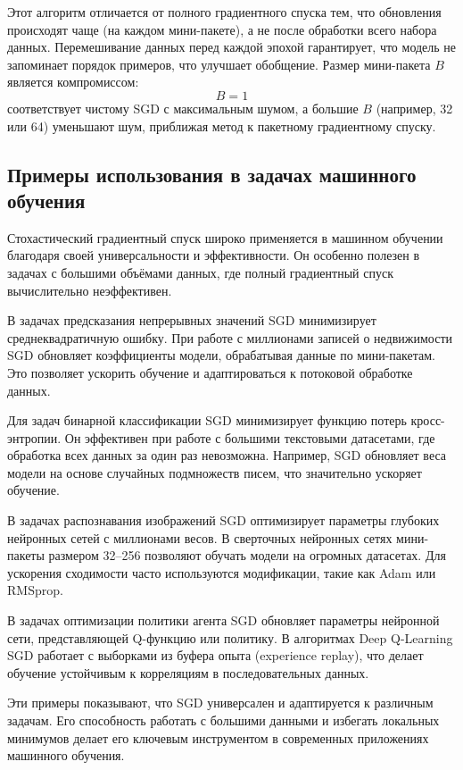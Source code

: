 \documentclass[11pt,a4paper]{article}
\begin{document}
Этот алгоритм отличается от полного градиентного спуска тем, что обновления происходят чаще (на каждом мини-пакете), а не после обработки всего набора данных. Перемешивание данных перед каждой эпохой гарантирует, что модель не запоминает порядок примеров, что улучшает обобщение. Размер мини-пакета \( B \) является компромиссом: 
\begin{equation}
B = 1
\end{equation}
соответствует чистому SGD с максимальным шумом, а большие \( B \) (например, 32 или 64) уменьшают шум, приближая метод к пакетному градиентному спуску.

\subsection{Примеры использования в задачах машинного обучения}
Стохастический градиентный спуск широко применяется в машинном обучении благодаря своей универсальности и эффективности. Он особенно полезен в задачах с большими объёмами данных, где полный градиентный спуск вычислительно неэффективен.

В задачах предсказания непрерывных значений SGD минимизирует среднеквадратичную ошибку. При работе с миллионами записей о недвижимости SGD обновляет коэффициенты модели, обрабатывая данные по мини-пакетам. Это позволяет ускорить обучение и адаптироваться к потоковой обработке данных.

Для задач бинарной классификации SGD минимизирует функцию потерь кросс-энтропии. Он эффективен при работе с большими текстовыми датасетами, где обработка всех данных за один раз невозможна. Например, SGD обновляет веса модели на основе случайных подмножеств писем, что значительно ускоряет обучение.

В задачах распознавания изображений SGD оптимизирует параметры глубоких нейронных сетей с миллионами весов. В сверточных нейронных сетях мини-пакеты размером 32--256 позволяют обучать модели на огромных датасетах. Для ускорения сходимости часто используются модификации, такие как Adam или RMSprop.

В задачах оптимизации политики агента SGD обновляет параметры нейронной сети, представляющей Q-функцию или политику. В алгоритмах Deep Q-Learning SGD работает с выборками из буфера опыта (experience replay), что делает обучение устойчивым к корреляциям в последовательных данных.

Эти примеры показывают, что SGD универсален и адаптируется к различным задачам. Его способность работать с большими данными и избегать локальных минимумов делает его ключевым инструментом в современных приложениях машинного обучения.
\end{document}
